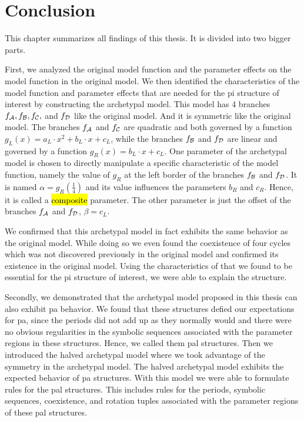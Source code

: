 \chapter{Conclusion}

This chapter summarizes all findings of this thesis.
It is divided into two bigger parts.

First, we analyzed the original model function and the parameter effects on the model function in the original model.
We then identified the characteristics of the model function and parameter effects that are needed for the \gls{pi} structure of interest by constructing the archetypal model.
This model has 4 branches $f_{\mathcal{A}}, f_{\mathcal{B}}, f_{\mathcal{C}},$ and $f_{\mathcal{D}}$ like the original model.
And it is symmetric like the original model.
The branches $f_{\mathcal{A}}$ and $f_{\mathcal{C}}$ are quadratic and both governed by a function $g_L(x) = a_L \cdot x^2 + b_L \cdot x + c_L$, while the branches $f_{\mathcal{B}}$ and $f_{\mathcal{D}}$ are linear and governed by a function $g_R(x) = b_L \cdot x + c_L$.
One parameter of the archetypal model is chosen to directly manipulate a specific characteristic of the model function, namely the value of $g_R$ at the left border of the branches $f_{\mathcal{B}}$ and $f_{\mathcal{D}}$.
It is named $\alpha = g_R\left(\frac{1}{4}\right)$ and its value influences the parameters $b_R$ and $c_R$.
Hence, it is called a \hl{composite} parameter.
The other parameter is just the offset of the branches $f_{\mathcal{A}}$ and $f_{\mathcal{D}}$, $\beta = c_L$.


We confirmed that this archetypal model in fact exhibits the same behavior as the original model.
While doing so we even found the coexistence of four cycles which was not discovered previously in the original model and confirmed its existence in the original model.
Using the characteristics of that we found to be essential for the \gls{pi} structure of interest, we were able to explain the structure.

Secondly, we demonstrated that the archetypal model proposed in this thesis can also exhibit \gls{pa} behavior.
We found that these structures defied our expectations for \gls{pa}, since the periods did not add up as they normally would and there were no obvious regularities in the symbolic sequences associated with the parameter regions in these structures.
Hence, we called them \gls{pal} structures.
Then we introduced the halved archetypal model where we took advantage of the symmetry in the archetypal model.
The halved archetypal model exhibits the expected behavior of \gls{pa} structures.
With this model we were able to formulate rules for the \gls{pal} structures.
This includes rules for the periods, symbolic sequences, coexistence, and rotation tuples associated with the parameter regions of these \gls{pal} structures.


